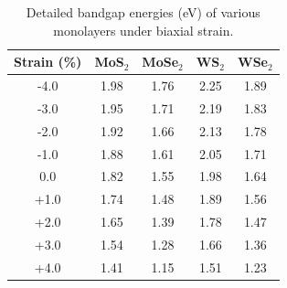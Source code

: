 \begin{table}[htbp]
    \centering
    \caption{Detailed bandgap energies (eV) of various monolayers under biaxial strain.}
    \label{tab:strain_data_raw}
    \begin{tabular}{c c c c c}
        \toprule
        \textbf{Strain (\%)} & \textbf{MoS$_2$} & \textbf{MoSe$_2$} & \textbf{WS$_2$} & \textbf{WSe$_2$} \\
        \midrule
        -4.0 & 1.98 & 1.76 & 2.25 & 1.89 \\
        -3.0 & 1.95 & 1.71 & 2.19 & 1.83 \\
        -2.0 & 1.92 & 1.66 & 2.13 & 1.78 \\
        -1.0 & 1.88 & 1.61 & 2.05 & 1.71 \\
         0.0 & 1.82 & 1.55 & 1.98 & 1.64 \\
        +1.0 & 1.74 & 1.48 & 1.89 & 1.56 \\
        +2.0 & 1.65 & 1.39 & 1.78 & 1.47 \\
        +3.0 & 1.54 & 1.28 & 1.66 & 1.36 \\
        +4.0 & 1.41 & 1.15 & 1.51 & 1.23 \\
        \bottomrule
    \end{tabular}
\end{table}
